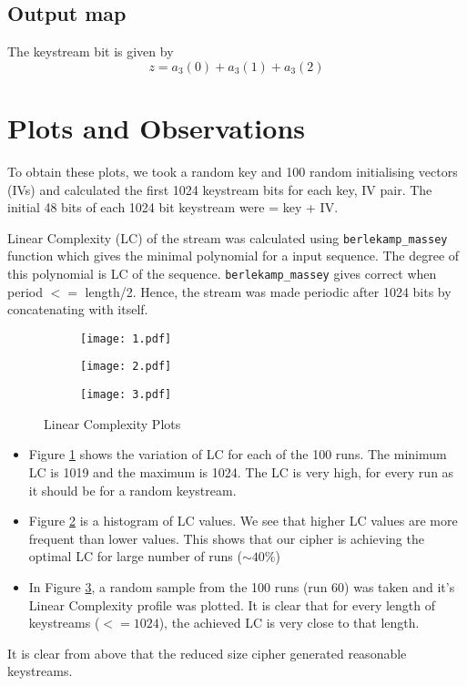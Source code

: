 \documentclass[a4paper,10pt]{article}
\begin{document}
\subsection{Output map}
The keystream bit is given by
\begin{equation}
    z = a_{3}(0) + a_{3}(1) + a_{3}(2)
\end{equation}
\clearpage
\section{Plots and Observations}
To obtain these plots, we took a random key and 100 random initialising vectors (IVs) and calculated the first 1024 keystream bits for each key, IV pair. The initial 48 bits of each 1024 bit keystream were = key + IV.

Linear Complexity (LC) of the stream was calculated using \verb!berlekamp_massey! function which gives the minimal polynomial for a input sequence. The degree of this polynomial is LC of the sequence. \verb!berlekamp_massey! gives correct when period $<=$ length/2. Hence, the stream was made periodic after 1024 bits by concatenating with itself.
\begin{figure}[H]
    \centering
    \begin{subfigure}{0.7\linewidth}
        \centering
        \texttt{[image: 1.pdf]}
        \caption{}
        \label{fig:1}
    \end{subfigure}
    \begin{subfigure}{0.48\linewidth}
        \centering
        \texttt{[image: 2.pdf]}
        \caption{}
        \label{fig:2}
    \end{subfigure}
    \begin{subfigure}{0.48\linewidth}
        \centering
        \texttt{[image: 3.pdf]}
        \caption{}
        \label{fig:3}
    \end{subfigure}
    \caption{Linear Complexity Plots}
    \label{fig:Q3}
\end{figure}
\begin{itemize}
    \item Figure \ref{fig:1} shows the variation of LC for each of the 100 runs. The minimum LC is 1019 and the maximum is 1024. The LC is very high, for every run as it should be for a random keystream.
    \item Figure \ref{fig:2} is a histogram of LC values. We see that higher LC values are more frequent than lower values. This shows that our cipher is achieving the optimal LC for large number of runs ($\sim 40\%$)
    \item In Figure \ref{fig:3}, a random sample from the 100 runs (run 60) was taken and it's Linear Complexity profile was plotted. It is clear that for every length of keystreams ($<=1024$), the achieved LC is very close to that length.
\end{itemize}
It is clear from above that the reduced size cipher generated reasonable keystreams.
\clearpage
\end{document}
